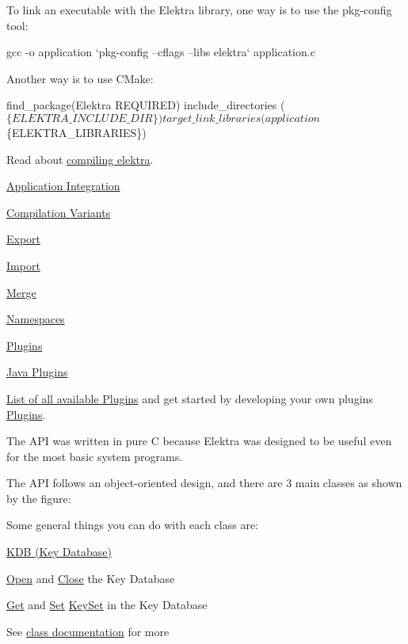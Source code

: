 To link an executable with the Elektra library, one way is to use the {\ttfamily pkg-\/config} tool\+:


\begin{DoxyCode}
gcc -o application `pkg-config --cflags --libs elektra` application.c
\end{DoxyCode}


Another way is to use C\+Make\+:


\begin{DoxyCode}
find\_package(Elektra REQUIRED)
include\_directories ($\{ELEKTRA\_INCLUDE\_DIR\})
target\_link\_libraries (application $\{ELEKTRA\_LIBRARIES\})
\end{DoxyCode}


Read about \hyperlink{doc_COMPILE_md}{compiling elektra}.


\begin{DoxyItemize}
\item \hyperlink{doc_tutorials_application-integration_md}{Application Integration}
\item \hyperlink{doc_tutorials_compilation-variants_md}{Compilation Variants}
\item \hyperlink{doc_tutorials_export_md}{Export}
\item \hyperlink{doc_tutorials_import_md}{Import}
\item \hyperlink{doc_tutorials_merge_md}{Merge}
\item \hyperlink{doc_tutorials_namespaces_md}{Namespaces}
\item \hyperlink{doc_tutorials_plugins_md}{Plugins}
\item \hyperlink{doc_tutorials_java-plugins_md}{Java Plugins}
\end{DoxyItemize}

\hyperlink{src_plugins_README_md}{List of all available Plugins} and get started by developing your own plugins \hyperlink{group__plugin}{Plugins}.

The A\+PI was written in pure C because Elektra was designed to be useful even for the most basic system programs.

The A\+PI follows an object-\/oriented design, and there are 3 main classes as shown by the figure\+:

 Some general things you can do with each class are\+:

\hyperlink{group__kdb}{K\+DB (Key Database)}


\begin{DoxyItemize}
\item \hyperlink{group__kdb_ga844e1299a84c3fbf1d3a905c5c893ba5}{Open} and \hyperlink{group__kdb_gadb54dc9fda17ee07deb9444df745c96f}{Close} the Key Database
\item \hyperlink{group__kdb_ga28e385fd9cb7ccfe0b2f1ed2f62453a1}{Get} and \hyperlink{group__kdb_ga11436b058408f83d303ca5e996832bcf}{Set} \hyperlink{group__keyset}{Key\+Set} in the Key Database
\item See \hyperlink{group__kdb}{class documentation} for more
\end{DoxyItemize}

